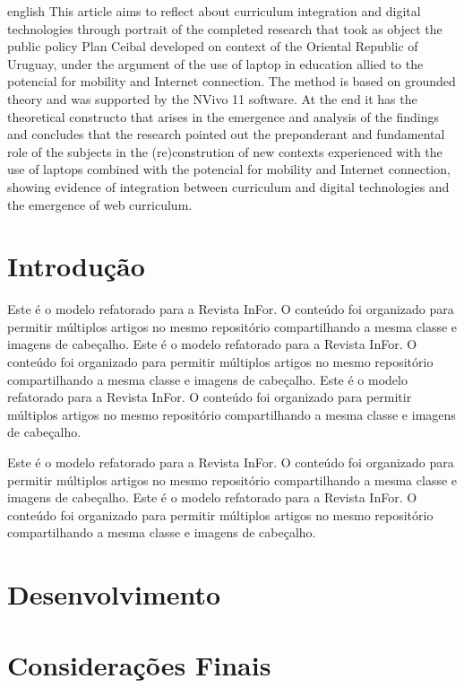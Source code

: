 \documentclass{../../common-shared/cls/Article_Class_RevInfor}
\begin{document}
\begin{resumo}[Abstract]
\begin{otherlanguage*}{english}
This article aims to reflect about curriculum integration and digital technologies through portrait of the completed research that took as object the public policy Plan Ceibal developed on context of the Oriental Republic of Uruguay, under the argument of the use of laptop in education allied to the potencial for mobility and Internet connection. The method is based on grounded theory and was supported by the NVivo 11 software. At the end it has the theoretical constructo that arises in the emergence and analysis of the findings and concludes that the research pointed out the preponderant and fundamental role of the subjects in the (re)constrution of new contexts experienced with the use of laptops combined with the potencial for mobility and Internet connection, showing evidence of integration between curriculum and digital technologies and the emergence of web curriculum.

\end{otherlanguage*}
\end{resumo}

\textual

\section{Introdução}
Este é o modelo refatorado para a Revista InFor. O conteúdo foi organizado para permitir múltiplos artigos no mesmo repositório compartilhando a mesma classe e imagens de cabeçalho.
Este é o modelo refatorado para a Revista InFor. O conteúdo foi organizado para permitir múltiplos artigos no mesmo repositório compartilhando a mesma classe e imagens de cabeçalho.
Este é o modelo refatorado para a Revista InFor. O conteúdo foi organizado para permitir múltiplos artigos no mesmo repositório compartilhando a mesma classe e imagens de cabeçalho.

Este é o modelo refatorado para a Revista InFor. O conteúdo foi organizado para permitir múltiplos artigos no mesmo repositório compartilhando a mesma classe e imagens de cabeçalho.
Este é o modelo refatorado para a Revista InFor. O conteúdo foi organizado para permitir múltiplos artigos no mesmo repositório compartilhando a mesma classe e imagens de cabeçalho.

\section{Desenvolvimento}
\lipsum[1-2]

\lipsum[3-4]

\lipsum[5-6]
\section{Considerações Finais}
\lipsum[7]

\lipsum[8]

\lipsum[9]

\postextual

\end{document}
